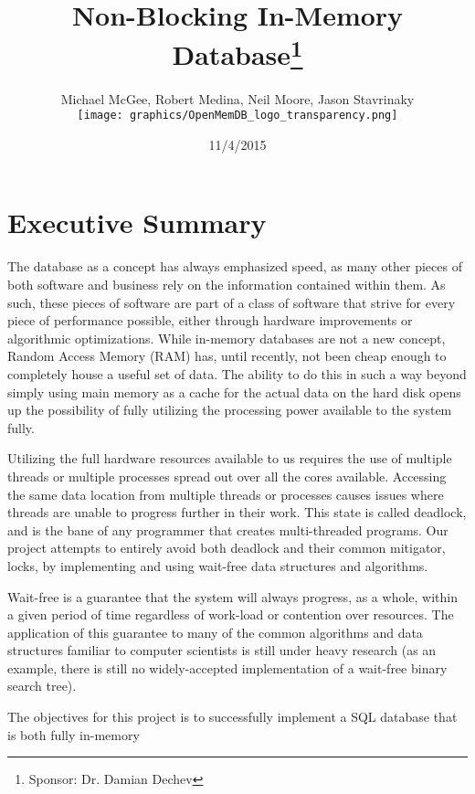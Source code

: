 \documentclass[letterpaper]{article}
\title{Non-Blocking In-Memory Database\thanks{Sponsor: Dr. Damian Dechev}}
\author{Michael McGee, Robert Medina, Neil Moore, Jason Stavrinaky\\[2ex]
	\texttt{[image: graphics/OpenMemDB\_logo\_transparency.png]}\\[1ex]
}
\date{11/4/2015}
\begin{document}
\maketitle
\newpage

\tableofcontents
\newpage


\section{Executive Summary}
The database as a concept has always emphasized speed, as many other pieces of both software
and business rely on the information contained within them. As such, these pieces of software
are part of a class of software that strive for every piece of performance possible, either through
hardware improvements or algorithmic optimizations. While in-memory databases are not a new concept,
Random Access Memory (RAM) has, until recently, not been cheap enough to completely house a useful
set of data. The ability to do this in such a way beyond simply using main memory as a cache for the 
actual data on the hard disk opens up the possibility of fully utilizing the processing power
available to the system fully.
\par\vspace{\baselineskip}
Utilizing the full hardware resources available to us requires the use of multiple threads or 
multiple processes spread out over all the cores available. Accessing the same data location 
from multiple threads or processes causes issues where threads are unable to progress further in their
work. This state is called deadlock, and is the bane of any programmer that creates multi-threaded
programs. Our project attempts to entirely avoid both deadlock and their common mitigator, locks,
by implementing and using wait-free data structures and algorithms.
\par\vspace{\baselineskip}
Wait-free is a guarantee that the system will always progress, as a whole, within a given period of time
regardless of work-load or contention over resources. The application of this guarantee to many
of the common algorithms and data structures familiar to computer scientists is still under heavy research
(as an example, there is still no widely-accepted implementation of a wait-free binary search tree).
\par\vspace{\baselineskip}
The objectives for this project is to successfully implement a SQL database that is both fully in-memory
\end{document}
